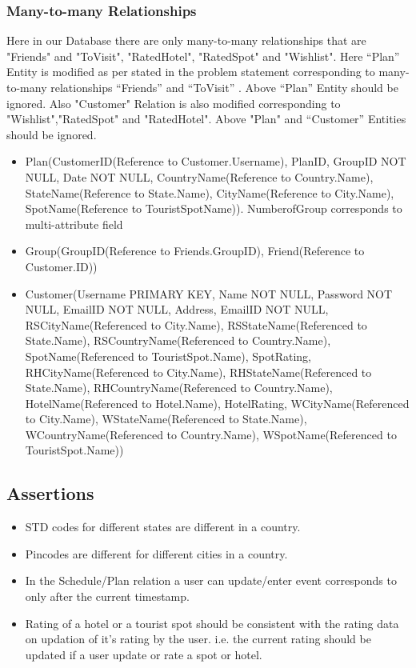 \documentclass[11pt]{article}
\begin{document}
\subsubsection{Many-to-many Relationships}
Here in our Database there are only many-to-many relationships that are "Friends" and "ToVisit", "RatedHotel", "RatedSpot" and "Wishlist". Here “Plan” Entity is modified as per stated in the problem statement corresponding to many-to-many relationships “Friends” and “ToVisit” . Above “Plan” Entity should be ignored. Also "Customer" Relation is also modified corresponding to "Wishlist","RatedSpot" and "RatedHotel". Above "Plan" and “Customer” Entities should be ignored.
\begin{itemize}
\item Plan(CustomerID(Reference to Customer.Username), PlanID, GroupID NOT NULL, Date NOT NULL, CountryName(Reference to Country.Name), StateName(Reference to State.Name), CityName(Reference to City.Name), SpotName(Reference to TouristSpotName)). NumberofGroup corresponds to multi-attribute field

\item Group(GroupID(Reference to Friends.GroupID), Friend(Reference to Customer.ID))

\item Customer(Username PRIMARY KEY, Name NOT NULL, Password NOT NULL, EmailID NOT NULL, Address, EmailID NOT NULL, RSCityName(Referenced to City.Name), RSStateName(Referenced to State.Name), RSCountryName(Referenced to Country.Name), SpotName(Referenced to TouristSpot.Name), SpotRating, RHCityName(Referenced to City.Name), RHStateName(Referenced to State.Name), RHCountryName(Referenced to Country.Name), HotelName(Referenced to Hotel.Name), HotelRating, WCityName(Referenced to City.Name), WStateName(Referenced to State.Name), WCountryName(Referenced to Country.Name), WSpotName(Referenced to TouristSpot.Name))
\end{itemize}

\subsection{Assertions}
\begin{itemize}
\item STD codes for different states are different in a country.
\item Pincodes are different for different cities in a country.
\item In the Schedule/Plan relation a user can update/enter event corresponds to  only after the current timestamp.
\item Rating of a hotel or a tourist spot should be consistent with the rating data on updation of it’s rating by the user. i.e. the current rating should be updated if a user update or rate a spot or hotel.
\end{itemize}
\end{document}

